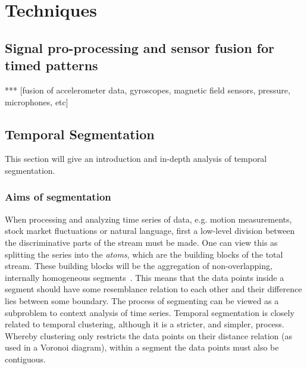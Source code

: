 
\chapter{Techniques} %

\label{Chapter2} %



\section{Signal pro-processing and sensor fusion for timed patterns}

*** [fusion of accelerometer data, gyroscopes, magnetic field sensors, pressure, microphones, etc]

\section{Temporal Segmentation}
This section will give an introduction and in-depth analysis of temporal segmentation.

\subsection{Aims of segmentation}
When processing and analyzing time series of data, e.g. motion measurements, stock market fluctuations or natural language, first a low-level division between the discriminative parts of the stream must be made.
One can view this as splitting the series into the \emph{atoms}, which are the building blocks of the total stream.
These building blocks will be the aggregation of non-overlapping, internally homogeneous segments~\cite{himberg2001time}.
This means that the data points inside a segment should have some resemblance relation to each other and their difference lies between some boundary.
The process of segmenting can be viewed as a subproblem to context analysis of time series.
Temporal segmentation is closely related to temporal clustering, although it is a stricter, and simpler, process.
Whereby clustering only restricts the data points on their distance relation (as used in a Voronoi diagram), within a segment the data points must also be contiguous.

